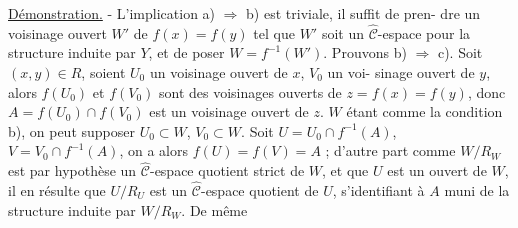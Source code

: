 \underline{Démonstration.} - L'implication a) $\Rightarrow$ b) est triviale, il suffit de pren-
dre un voisinage ouvert $W'$ de $f(x) = f(y)$ tel que $W'$ soit un $\hat{\mathcal{C}}$-espace
pour la structure induite par $Y$, et de poser $W = f^{-1}(W')$. Prouvons
b) $\Rightarrow$ c). Soit $(x,y) \in R$, soient $U_0$ un voisinage ouvert de $x$, $V_0$ un voi-
sinage ouvert de $y$, alors $f(U_0)$ et $f(V_0)$ sont des voisinages ouverts de
$z = f(x) = f(y)$, donc $A = f(U_0) \cap f(V_0)$ est un voisinage ouvert de $z$.
$W$ étant comme la condition b), on peut supposer $U_0 \subset W$, $V_0 \subset W$. Soit
$U = U_0 \cap f^{-1}(A)$, $V = V_0 \cap f^{-1}(A)$, on a alors $f(U) = f(V) = A$ ; d'autre part
comme $W/R_W$ est par hypothèse un $\hat{\mathcal{C}}$-espace quotient strict de $W$, et que
$U$ est un ouvert de $W$, il en résulte que $U/R_U$ est un $\hat{\mathcal{C}}$-espace quotient
de $U$, s'identifiant à $A$ muni de la structure induite par $W/R_W$. De même

\newpage




